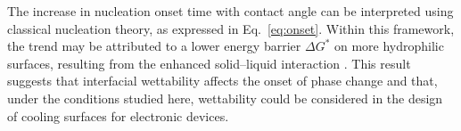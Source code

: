 The increase in nucleation onset time with contact angle can be interpreted using classical nucleation theory, as expressed in Eq.~\eqref{eq:onset}. Within this framework, the trend may be attributed to a lower energy barrier $\Delta G^*$ on more hydrophilic surfaces, resulting from the enhanced solid--liquid interaction \cite{carey2018}. This result suggests that interfacial wettability affects the onset of phase change and that, under the conditions studied here, wettability could be considered in the design of cooling surfaces for electronic devices.
